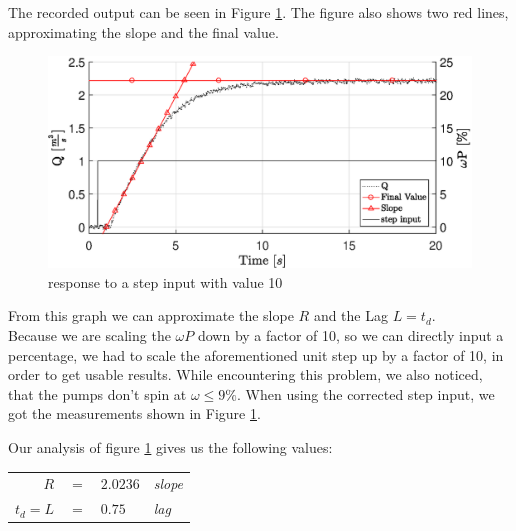 The recorded output can be seen in Figure \ref{fig:stepin}.
The figure also shows two red lines, approximating the slope and the final value.

\begin{figure}[H]
    \centering
    \includegraphics[width=\textwidth]{figures/07controllerDesign/StepResponseLabeled.eps}
    \caption{response to a step input with value 10}
	\label{fig:stepin}
\end{figure}

From this graph we can approximate the slope $R$ and the Lag $L=t_d$.\\
Because we are scaling the $\omega P$ down by a factor of 10, so we can directly input a percentage,
we had to scale the aforementioned unit step up by a factor of 10,
in order to get usable results.
While encountering this problem, we also noticed, that the pumps don't spin at $\omega \leq 9\%$.
When using the corrected step input, we got the measurements shown in Figure \ref{fig:stepin}.

Our analysis of figure \ref{fig:stepin} gives us the following values:
\\
\begin{tabular}{r c l l}
	$R$ 	& $=$ & $2.0236$ 	& \footnotesize{\textit{slope}}\\
	$t_d=L$	& $=$ & $0.75$ 		& \footnotesize{\textit{lag}}\\
\end{tabular}


